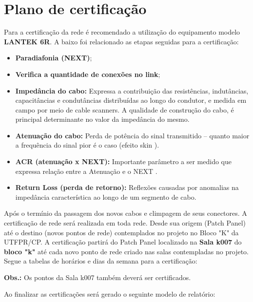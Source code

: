 \documentclass[	DIV=calc,%
paper=a4,%
fontsize=12pt,%
onecolumn]{scrartcl}	 					%
\begin{document}
	\section{Plano de certificação}
	
	Para a certificação da rede é recomendado a utilização do equipamento modelo \textbf{LANTEK 6R}. 
	A baixo foi relacionado as etapas seguidas para a certificação:
	\begin{itemize}
		\item \textbf{Paradiafonia (NEXT)};
		\item \textbf{Verifica a quantidade de conexões no link};
		\item \textbf{Impedância do cabo:} Expressa a contribuição das resistências, indutâncias, capacitâncias e condutâncias distribuídas ao longo do condutor, e medida em campo por meio de cable scanners. A qualidade de construção do cabo, é principal determinante no valor da impedância do mesmo.
		\item \textbf{Atenuação do cabo:} Perda de potência do sinal transmitido – quanto maior a frequência do sinal pior é o caso (efeito skin ).
		\item \textbf{ACR (atenuação x NEXT):} Importante parâmetro a ser medido que expressa relação entre a Atenuação e o NEXT .
		\item \textbf{Return Loss (perda de retorno):} Reflexões causadas por anomalias na impedância característica ao longo de um segmento de cabo.
	\end{itemize}
	Após o termínio da passagem dos novos cabos e climpagem de seus conectores. A certificação de rede será realizada em toda rede. Desde sua origem (Patch Panel) até o destino (novos pontos de rede) contemplados no projeto no Bloco "K" da UTFPR/CP. 
	A certificação partirá do Patch Panel localizado na \textbf{Sala k007} do \textbf{bloco "k"} até cada novo ponto de rede criado nas salas contempladas no projeto. 
	Segue a tabelas de horários e dias da semana para a certificação:
	
	
	\textbf{Obs.:} Os pontos da Sala k007 também deverá ser certificados.
	
	
	Ao finalizar as certificações será gerado o seguinte modelo de relatório:
	
\end{document}
